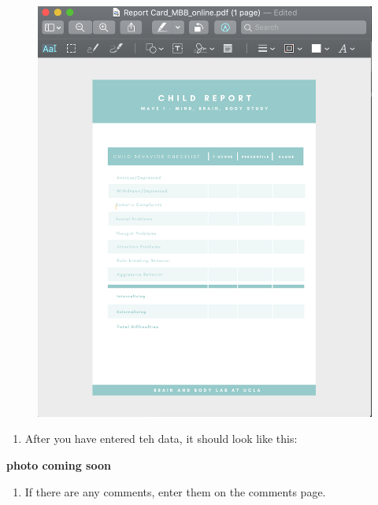 \documentclass[]{book}
\providecommand{\tightlist}{%
  \setlength{\itemsep}{0pt}\setlength{\parskip}{0pt}}
\begin{document}
\begin{figure}
\centering
\includegraphics{images/report_card_online/3.png}
\caption{}
\end{figure}

\begin{enumerate}
\def\labelenumi{\arabic{enumi}.}
\setcounter{enumi}{3}
\tightlist
\item
  After you have entered teh data, it should look like this:
\end{enumerate}

\textbf{photo coming soon}

\begin{enumerate}
\def\labelenumi{\arabic{enumi}.}
\setcounter{enumi}{4}
\tightlist
\item
  If there are any comments, enter them on the comments page.
\end{enumerate}
\end{document}
